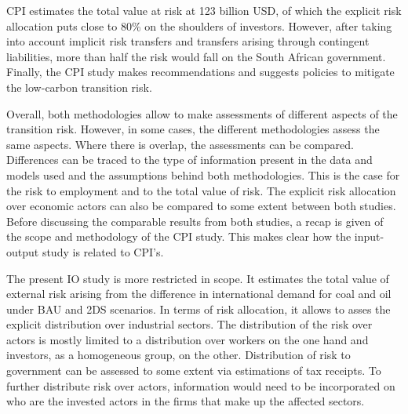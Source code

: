\documentclass[12pt,english]{article}
\begin{document}
CPI estimates the total value at risk at 123 billion USD, of which the explicit risk allocation puts close to 80\% on the shoulders of investors. However, after taking into account implicit risk transfers and transfers arising through contingent liabilities, more than half the risk would fall on the South African government. Finally, the CPI study makes recommendations and suggests policies to mitigate the low-carbon transition risk.

 
Overall, both methodologies allow to make assessments of different aspects of the transition risk. However, in some cases, the different methodologies assess the same aspects. %
Where there is overlap, the assessments can be compared. Differences can be traced to the type of information present in the data and models used and the assumptions behind both methodologies. This is the case for the risk %
to employment and to the total value of risk. The explicit risk allocation over economic actors can also be compared to some extent between both studies. %
Before discussing the comparable results from both studies, a recap is given of the scope and methodology of the CPI study. This makes clear how the input-output study is related to CPI's. 


The present IO study is more restricted in scope. It estimates the total value of external risk arising from the difference in international demand for coal and oil under BAU and 2DS scenarios. In terms of risk allocation, it allows to asses the explicit distribution over industrial sectors. The distribution of the risk over actors is mostly limited to a distribution over workers on the one hand and investors, as a homogeneous group, on the other. Distribution of risk to government can be assessed to some extent via estimations of tax receipts. To further distribute risk over actors, information would need to be incorporated on who are the invested actors in the firms that make up the affected sectors. 
\end{document}
